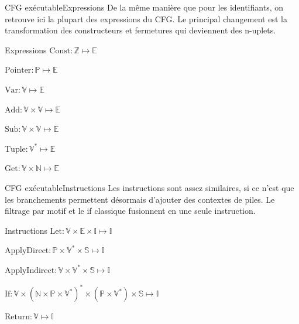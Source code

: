 \documentclass{beamer}
\begin{document}
\begin{frame}{CFG exécutable}{Expressions}
    De la même manière que pour les identifiants, on retrouve ici la plupart des expressions du CFG. Le principal changement est la transformation des constructeurs et fermetures qui deviennent des n-uplets.
    
    \begin{block}{Expressions}
        $\text{Const} : \mathbb{Z} \mapsto \mathbb{E}$%
        
        $\text{Pointer} : \mathbb{P} \mapsto \mathbb{E}$%
        
        $\text{Var} : \mathbb{V} \mapsto \mathbb{E}$%
        
        $\text{Add} : \mathbb{V} \times \mathbb{V} \mapsto \mathbb{E}$%
        
        $\text{Sub} : \mathbb{V} \times \mathbb{V} \mapsto \mathbb{E}$%
        
        $\text{Tuple} : \mathbb{V}^{*} \mapsto \mathbb{E}$%
        
        $\text{Get} : \mathbb{V} \times \mathbb{N} \mapsto \mathbb{E}$%
    \end{block}
\end{frame}

\begin{frame}{CFG exécutable}{Instructions}
    Les instructions sont assez similaires, si ce n'est que les branchements permettent désormais d'ajouter des contextes de piles. Le filtrage par motif et le if classique fusionnent en une seule instruction.
    
    \begin{block}{Instructions}
        $\text{Let} : \mathbb{V} \times \mathbb{E} \times \mathbb{I} \mapsto \mathbb{I}$%
        
        $\text{ApplyDirect} : \mathbb{P} \times \mathbb{V}^{*} \times \mathbb{S} \mapsto \mathbb{I}$%
        
        $\text{ApplyIndirect} : \mathbb{V} \times \mathbb{V}^{*} \times \mathbb{S} \mapsto \mathbb{I}$%
        
        $\text{If} : \mathbb{V} \times (\mathbb{N} \times \mathbb{P} \times \mathbb{V}^{*})^{*} \times (\mathbb{P} \times \mathbb{V}^{*}) \times \mathbb{S} \mapsto \mathbb{I}$%
        
        $\text{Return} : \mathbb{V} \mapsto \mathbb{I}$%
    \end{block}
\end{frame}
\end{document}
